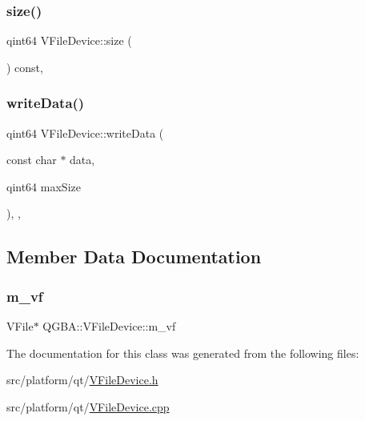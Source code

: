 \subsubsection{\texorpdfstring{size()}{size()}}
{\footnotesize\ttfamily qint64 V\+File\+Device\+::size (\begin{DoxyParamCaption}{ }\end{DoxyParamCaption}) const\hspace{0.3cm}{\ttfamily [override]}, {\ttfamily [virtual]}}

\mbox{\label{class_q_g_b_a_1_1_v_file_device_a8f0c1f21080bb1587997d1c4e72cc1d8}} 
\subsubsection{\texorpdfstring{write\+Data()}{writeData()}}
{\footnotesize\ttfamily qint64 V\+File\+Device\+::write\+Data (\begin{DoxyParamCaption}\item[{const char $\ast$}]{data,  }\item[{qint64}]{max\+Size }\end{DoxyParamCaption})\hspace{0.3cm}{\ttfamily [override]}, {\ttfamily [protected]}, {\ttfamily [virtual]}}



\subsection{Member Data Documentation}
\mbox{\label{class_q_g_b_a_1_1_v_file_device_a2792e1abd3bb07f7d504682dd3b0342a}} 
\subsubsection{\texorpdfstring{m\+\_\+vf}{m\_vf}}
{\footnotesize\ttfamily V\+File$\ast$ Q\+G\+B\+A\+::\+V\+File\+Device\+::m\+\_\+vf\hspace{0.3cm}{\ttfamily [private]}}



The documentation for this class was generated from the following files\+:\begin{DoxyCompactItemize}
\item 
src/platform/qt/\mbox{\hyperlink{_v_file_device_8h}{V\+File\+Device.\+h}}\item 
src/platform/qt/\mbox{\hyperlink{_v_file_device_8cpp}{V\+File\+Device.\+cpp}}\end{DoxyCompactItemize}

